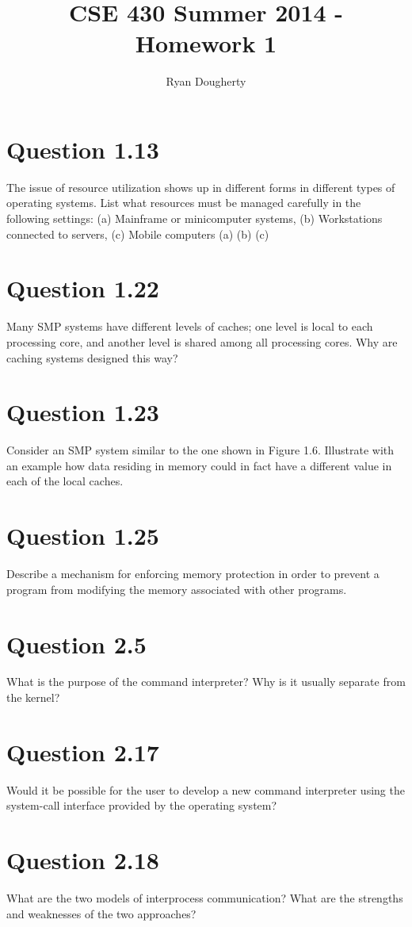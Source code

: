 \documentclass[12pt]{article}
\title{CSE 430 Summer 2014 - Homework 1}
\author{Ryan Dougherty}
\date{}                                           %
\begin{document}
\maketitle

\section*{Question 1.13} {\color{blue}The issue of resource utilization shows up in different forms in different types of operating systems. List what resources must be managed carefully in the following settings: (a) Mainframe or minicomputer systems, (b) Workstations connected to servers, (c) Mobile computers}
(a) (b) (c)

\section*{Question 1.22} {\color{blue}Many SMP systems have different levels of caches; one level is local to each processing core, and another level is shared among all processing cores. Why are caching systems designed this way?}

\section*{Question 1.23} {\color{blue}Consider an SMP system similar to the one shown in Figure 1.6. Illustrate with an example how data residing in memory could in fact have a different value in each of the local caches.}

\section*{Question 1.25} {\color{blue}Describe a mechanism for enforcing memory protection in order to prevent a program from modifying the memory associated with other programs.}

\section*{Question 2.5} {\color{blue}What is the purpose of the command interpreter? Why is it usually separate from the kernel?}

\section*{Question 2.17} {\color{blue}Would it be possible for the user to develop a new command interpreter using the system-call interface provided by the operating system?}

\section*{Question 2.18} {\color{blue}What are the two models of interprocess communication? What are the strengths and weaknesses of the two approaches?}
\end{document}
